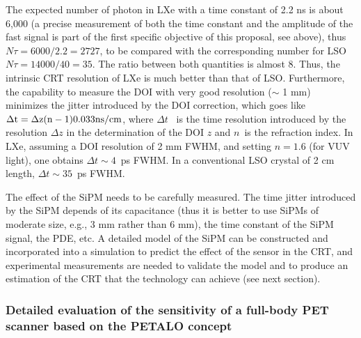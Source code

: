 The expected number of photon in LXe with a time constant of 2.2 ns is about 6,000 (a precise measurement of both the time constant and the amplitude of the fast signal is part of the first specific objective of this proposal, see above), thus $N\tau = 6000/2.2 = 2727$, to be compared with the corresponding number for LSO $N\tau = 14000/40 = 35$. The ratio between both quantities is almost 8. Thus, the intrinsic CRT resolution of LXe is much better than that of LSO. Furthermore, the capability to measure the DOI with very good resolution ($\sim$ 1 mm) minimizes the jitter introduced by the DOI correction, which goes like
${\rm \Delta t = \Delta z (n - 1) 0.033 ns/cm}$, where $\Delta t$~ is the time resolution introduced by the resolution $\Delta z$ in the determination of the DOI $z$ and $n$~is the refraction index. In LXe, assuming a DOI resolution of 2 mm FWHM, and setting $n=1.6$ (for VUV light), one obtains $\Delta t \sim 4$~ps FWHM. In a conventional LSO crystal of 2 cm length, $\Delta t \sim 35$~ps FWHM.

The effect of the SiPM needs to be carefully measured. The time jitter introduced by the SiPM depends of its capacitance (thus it is better to use SiPMs of moderate size, e.g., 3 mm rather than 6 mm), the time constant of the SiPM signal, the PDE, etc. A detailed model of the SiPM can be constructed and incorporated into a simulation to predict the effect of the sensor in the CRT, and experimental measurements are needed to validate the model and to produce an estimation of the CRT that the technology can achieve (see next section).

\subsubsection*{Detailed evaluation of the sensitivity of a full-body PET scanner based on the PETALO concept}


\\

